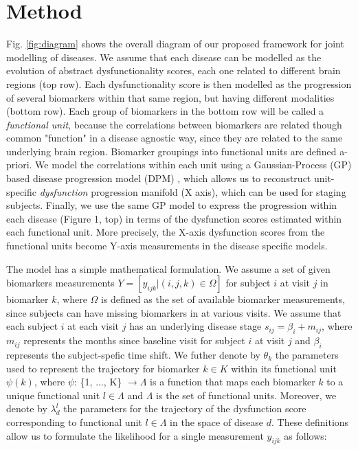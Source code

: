 \documentclass{llncs}
\begin{document}
\section{Method}

Fig. \ref{fig:diagram} shows the overall diagram of our proposed framework for joint modelling of diseases. We assume that each disease can be modelled as the evolution of abstract dysfunctionality scores, each one related to different brain regions (top row). Each dysfunctionality score is then modelled as the progression of several biomarkers within that same region, but having different modalities (bottom row). Each group of biomarkers in the bottom row will be called a \emph{functional unit}, because the correlations between biomarkers are related though common "function" in a disease agnostic way, since they are related to the same underlying brain region. Biomarker groupings into functional units are defined a-priori. We model the correlations within each unit using a Gaussian-Process (GP) based disease progression model (DPM) \cite{lorenzi2017disease}, which allows us to reconstruct unit-specific \emph{dysfunction} progression manifold (X axis), which can be used for staging subjects. Finally, we use the same GP model to express the progression within each disease (Figure 1, top) in terms of the dysfunction scores estimated within each functional unit. More precisely, the X-axis dysfunction scores from the functional units become Y-axis measurements in the disease specific models.

The model has a simple mathematical formulation. We assume a set of given biomarkers measurements $Y = [y_{ijk} | (i,j,k) \in \Omega]$ for subject $i$ at visit $j$ in biomarker $k$, where $\Omega$ is defined as the set of available biomarker measurements, since subjects can have missing biomarkers in at various visits. We assume that each subject $i$ at each visit $j$ has an underlying disease stage $s_{ij} = \beta_i + m_{ij}$, where $m_{ij}$ represents the months since baseline visit for subject $i$ at visit $j$ and $\beta_i$ represents the subject-spefic time shift. We futher denote by $\theta_k$ the parameters used to represent the trajectory for biomarker $k \in K$ within its functional unit $\psi(k)$, where $\psi$: \{1, ..., K\} $ \rightarrow \Lambda$ is a function that maps each biomarker $k$ to a unique functional unit $l \in \Lambda$ and $\Lambda$ is the set of functional units. Moreover, we denote by $\lambda_d^l$ the parameters for the trajectory of the dysfunction score corresponding to functional unit $l \in \Lambda$ in the space of disease $d$. These definitions allow us to formulate the likelihood for a single measurement $y_{ijk}$ as follows:
\end{document}

